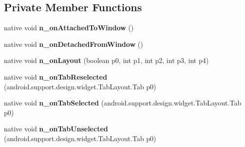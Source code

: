 \subsection*{Private Member Functions}
\begin{DoxyCompactItemize}
\item 
\mbox{\label{classmd5270abb39e60627f0f200893b490a1ade_1_1TabbedPageRenderer_ad0abc58418ee19fc0eb3c0f02189675c}} 
native void {\bfseries n\+\_\+on\+Attached\+To\+Window} ()
\item 
\mbox{\label{classmd5270abb39e60627f0f200893b490a1ade_1_1TabbedPageRenderer_a06ad1a28c8566b4a6e4338aab262bc31}} 
native void {\bfseries n\+\_\+on\+Detached\+From\+Window} ()
\item 
\mbox{\label{classmd5270abb39e60627f0f200893b490a1ade_1_1TabbedPageRenderer_a4fb0dec5bc638178fcee3690897ce067}} 
native void {\bfseries n\+\_\+on\+Layout} (boolean p0, int p1, int p2, int p3, int p4)
\item 
\mbox{\label{classmd5270abb39e60627f0f200893b490a1ade_1_1TabbedPageRenderer_a01ec360f376442d355008cdf6cb168b4}} 
native void {\bfseries n\+\_\+on\+Tab\+Reselected} (android.\+support.\+design.\+widget.\+Tab\+Layout.\+Tab p0)
\item 
\mbox{\label{classmd5270abb39e60627f0f200893b490a1ade_1_1TabbedPageRenderer_a1bd14ca1c0228a1aa5548d9f76c1a490}} 
native void {\bfseries n\+\_\+on\+Tab\+Selected} (android.\+support.\+design.\+widget.\+Tab\+Layout.\+Tab p0)
\item 
\mbox{\label{classmd5270abb39e60627f0f200893b490a1ade_1_1TabbedPageRenderer_a0253eb405a19b6bcb6a1b48b68afbd83}} 
native void {\bfseries n\+\_\+on\+Tab\+Unselected} (android.\+support.\+design.\+widget.\+Tab\+Layout.\+Tab p0)
\item 
\mbox{\label{classmd5270abb39e60627f0f200893b490a1ade_1_1TabbedPageRenderer_aa4d8436848d7db0020636b0af3052198}} 

\end{DoxyCompactItemize}
